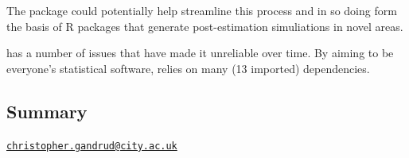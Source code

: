 The  package could potentially help streamline this
process and in so doing form the basis of R packages that generate
post-estimation simuliations in novel areas.

 has a number of issues that have made it unreliable over
time. By aiming to be everyone's statistical software, 
relies on many (13 imported) dependencies.

\subsection{Summary}\label{summary}



\address{%
Christopher Gandrud\\
City University London and Hertie School of Governance\\
Rhind Building\\ London, EC1V 0HB\\
}
\href{mailto:christopher.gandrud@city.ac.uk}{\nolinkurl{christopher.gandrud@city.ac.uk}}

